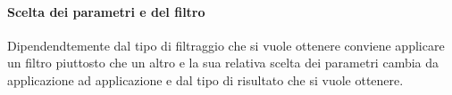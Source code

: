 \paragraph{Scelta dei parametri e del filtro}
Dipendendtemente dal tipo di filtraggio che si vuole ottenere conviene applicare un 
filtro piuttosto che un altro e la sua relativa scelta dei parametri cambia da
applicazione ad applicazione e dal tipo di risultato che si vuole ottenere.

